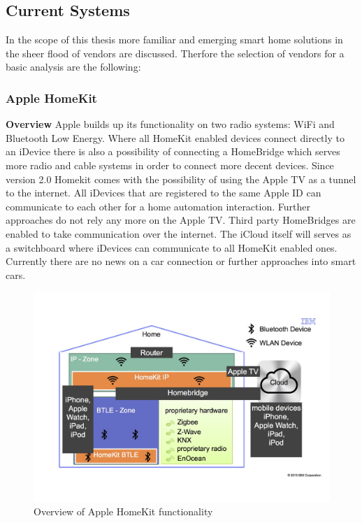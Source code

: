 				\pagebreak

	\subsection{Current Systems}
		In the scope of this thesis more familiar and emerging smart home solutions in the sheer flood of vendors are discussed. Therfore the selection of vendors for a basic analysis are the following:

		\subsubsection{Apple HomeKit} 
			\textbf{Overview}
				Apple builds up its functionality on two radio systems: WiFi and Bluetooth Low Energy. Where all HomeKit enabled devices connect directly to an iDevice there is also a possibility of connecting a HomeBridge which serves more radio and cable systems in order to connect more decent devices. Since version 2.0 Homekit comes with the possibility of using the Apple TV as a tunnel to the internet. All iDevices that are registered to the same Apple ID can communicate to each other for a home automation interaction. Further approaches do not rely any more on the Apple TV. Third party HomeBridges are enabled to take communication over the internet. The iCloud itself will serves as a switchboard where iDevices can communicate to all HomeKit enabled ones. Currently there are no news on a car connection or further approaches into smart cars.

				\begin{figure}[h]
					\centering
						\includegraphics[width=.9\textwidth]{images/theory/SmartHomeLandscape.jpg}
					\caption{Overview of Apple HomeKit functionality}
					\label{fig:SmartHomeLandscape}
				\end{figure}

